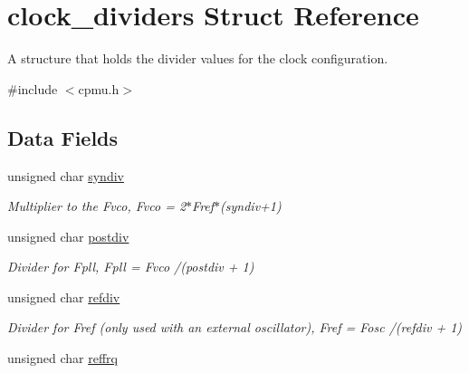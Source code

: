 \hypertarget{structclock__dividers}{}\section{clock\+\_\+dividers Struct Reference}
\label{structclock__dividers}


A structure that holds the divider values for the clock configuration.  




{\ttfamily \#include $<$cpmu.\+h$>$}

\subsection*{Data Fields}
\begin{DoxyCompactItemize}
\item 
\hypertarget{structclock__dividers_ac472b8dab9de3965014f9107d582f2c8}{}unsigned char \hyperlink{structclock__dividers_ac472b8dab9de3965014f9107d582f2c8}{syndiv}\label{structclock__dividers_ac472b8dab9de3965014f9107d582f2c8}

\begin{DoxyCompactList}\small\item\em Multiplier to the Fvco, Fvco = 2$\ast$\+Fref$\ast$(syndiv+1) \end{DoxyCompactList}\item 
\hypertarget{structclock__dividers_af8d6bd3f32d7274172c25ed5d7daad78}{}unsigned char \hyperlink{structclock__dividers_af8d6bd3f32d7274172c25ed5d7daad78}{postdiv}\label{structclock__dividers_af8d6bd3f32d7274172c25ed5d7daad78}

\begin{DoxyCompactList}\small\item\em Divider for Fpll, Fpll = Fvco /(postdiv + 1) \end{DoxyCompactList}\item 
\hypertarget{structclock__dividers_aa03d4b8ba36c4d6e7b6db9391921c816}{}unsigned char \hyperlink{structclock__dividers_aa03d4b8ba36c4d6e7b6db9391921c816}{refdiv}\label{structclock__dividers_aa03d4b8ba36c4d6e7b6db9391921c816}

\begin{DoxyCompactList}\small\item\em Divider for Fref (only used with an external oscillator), Fref = Fosc /(refdiv + 1) \end{DoxyCompactList}\item 
\hypertarget{structclock__dividers_a008f0adff713e4325900afe73ba3f322}{}unsigned char \hyperlink{structclock__dividers_a008f0adff713e4325900afe73ba3f322}{reffrq}\label{structclock__dividers_a008f0adff713e4325900afe73ba3f322}


\end{DoxyCompactItemize}
